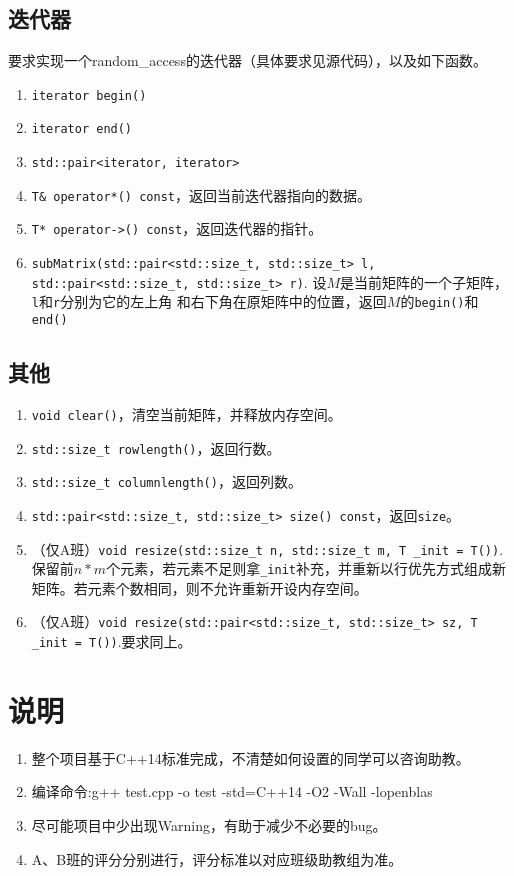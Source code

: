 \documentclass[12pt, a4paper]{article}
\newcommand{\ilc}{\texttt}
\begin{document}
\subsection{迭代器}
  要求实现一个random\_access的迭代器（具体要求见源代码），以及如下函数。
  \begin{enumerate}
    \item \ilc{iterator begin()}
    \item \ilc{iterator end()}
    \item \ilc{std::pair<iterator, iterator>}
    \item \ilc{T\& operator*() const}，返回当前迭代器指向的数据。
    \item \ilc{T* operator->() const}，返回迭代器的指针。
    \item \ilc{subMatrix(std::pair<std::size\_t, std::size\_t> l,
              std::pair<std::size\_t, std::size\_t> r)}.
    设$M$是当前矩阵的一个子矩阵，\ilc{l}和\ilc{r}分别为它的左上角
    和右下角在原矩阵中的位置，返回$M$的\ilc{begin()}和\ilc{end()}
  \end{enumerate}

\subsection{其他}
  \begin{enumerate}
    \item \ilc{void clear()}，清空当前矩阵，并释放内存空间。
    \item \ilc{std::size\_t rowlength()}，返回行数。
    \item \ilc{std::size\_t columnlength()}，返回列数。
    \item \ilc{std::pair<std::size\_t, std::size\_t> size() const}，返回\ilc{size}。
    \item （仅A班）\ilc{void resize(std::size\_t n, std::size\_t m, T \_init = T())}.保留前$n*m$个元素，若元素不足则拿\ilc{\_init}补充，并重新以行优先方式组成新矩阵。若元素个数相同，则不允许重新开设内存空间。
    \item （仅A班）\ilc{void resize(std::pair<std::size\_t, std::size\_t> sz, T \_init = T())}.要求同上。
  \end{enumerate}

\section{说明}
  \begin{enumerate}
  	\item 整个项目基于C++14标准完成，不清楚如何设置的同学可以咨询助教。
  	\item 编译命令:g++ test.cpp -o test -std=C++14 -O2 -Wall -lopenblas
  	\item 尽可能项目中少出现Warning，有助于减少不必要的bug。
  	\item A、B班的评分分别进行，评分标准以对应班级助教组为准。
  \end{enumerate}
\end{document}
